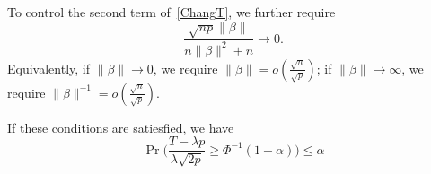\documentclass[review]{elsarticle}
\theoremstyle{plain}
\theoremstyle{definition}
\theoremstyle{remark}
\begin{document}
To control the second term of~\eqref{ChangT}, we further require
\begin{equation}
\frac{\sqrt{np}\|\beta\|}{n\|\beta\|^2+n}\to 0.
\end{equation}
Equivalently, if $\|\beta\|\to 0$, we require $\|\beta\|=o(\frac{\sqrt{n}}{\sqrt{p}})$; if $\|\beta\|\to \infty$, we require $\|\beta\|^{-1}=o(\frac{\sqrt{n}}{\sqrt{p}})$.

If these conditions are satiesfied, we have 
\begin{equation}
    \Pr\Big(\frac{T-\lambda p}{\lambda\sqrt{2p}}\geq \Phi^{-1}(1-\alpha)\Big)\leq
    \alpha
\end{equation}




%
\end{document}
